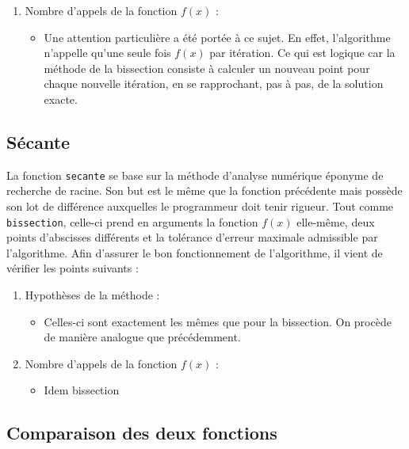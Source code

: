\documentclass[12pt]{article}
\begin{document}
\begin{enumerate}[label=\roman*.]
\begin{itemize}
                \end{itemize}
            
            \item 
            Nombre d'appels de la fonction $f(x)$ :
                \begin{itemize}
                    \item Une attention particulière a été portée à ce sujet. En effet, l'algorithme n'appelle qu'une seule fois $f(x)$ par itération. Ce qui est logique car la méthode de la bissection consiste à calculer un nouveau point pour chaque nouvelle itération, en se rapprochant, pas à pas, de la solution exacte.
                \end{itemize}
        \end{enumerate}
    
    \subsection{Sécante}
        La fonction \texttt{secante} se base sur la méthode d'analyse numérique éponyme de recherche de racine. Son but est le même que la fonction précédente mais possède son lot de différence auxquelles le programmeur doit tenir rigueur. Tout comme \texttt{bissection}, celle-ci prend en arguments la fonction $f(x)$ elle-même, deux points d'abscisses différents et la tolérance d'erreur maximale admissible par l'algorithme. Afin d'assurer le bon fonctionnement de l'algorithme, il vient de vérifier les points suivants :
    \begin{enumerate}[label=\roman*.]
        \item Hypothèses de la méthode : 
            \begin{itemize}
                \item Celles-ci sont exactement les mêmes que pour la bissection. On procède de manière analogue que précédemment.
            \end{itemize}
            
        \item 
        Nombre d'appels de la fonction $f(x)$ : 
            \begin{itemize}
                \item Idem bissection
            \end{itemize}
            
    \end{enumerate}
    
    \subsection{Comparaison des deux fonctions}
    
\end{document}
